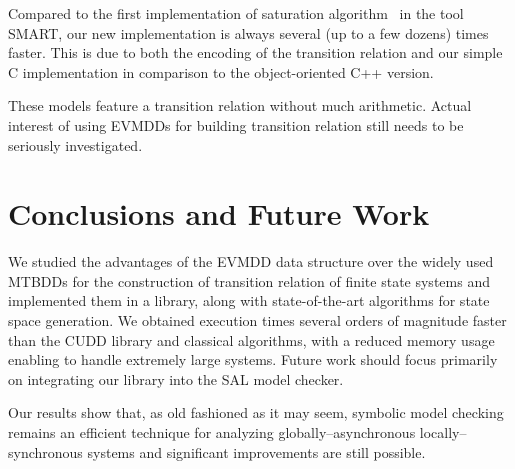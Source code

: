 \documentclass[nocover]             %
{NASA}                       %
\begin{document}
Compared to the first implementation of saturation algorithm~\cite{Saturation2001} in the tool SMART, our new implementation is 
always several (up to a few dozens) times faster. This is due to both the encoding of the transition relation and our simple C 
implementation in comparison to the object-oriented C++ version.

These models feature a transition relation without much arithmetic.
Actual interest of using EVMDDs for building transition relation
still needs to be seriously investigated.

\section{Conclusions and Future Work}

We studied the advantages of the EVMDD data structure
over the widely used MTBDDs for the construction
of transition relation of finite state systems
and implemented them in a library, along with
state-of-the-art algorithms for state space generation.
We obtained execution times several orders of magnitude faster
than the CUDD library and classical algorithms,
with a reduced memory usage enabling to handle extremely large systems.
Future work should focus primarily on integrating our library
into the SAL model checker.

Our results show that, as old fashioned as it may seem,
symbolic model checking remains an efficient technique
for analyzing globally--asynchronous locally--synchronous systems and
significant improvements are still possible.



\end{document}
